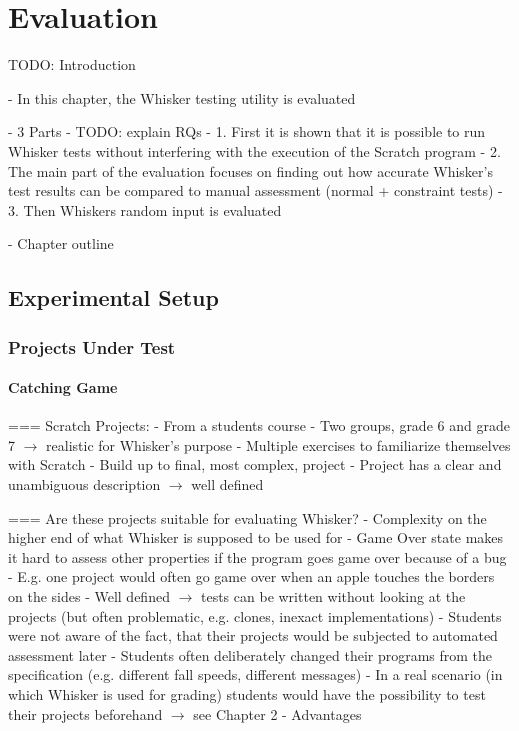 

\chapter{Evaluation}%
\label{cha:evaluation}

TODO: Introduction

- In this chapter, the Whisker testing utility is evaluated

- 3 Parts
- TODO: explain RQs
    - 1. First it is shown that it is possible to run Whisker tests without interfering with the execution of the Scratch program
    - 2. The main part of the evaluation focuses on finding out how accurate Whisker's test results can be compared to manual assessment (normal + constraint tests)
    - 3. Then Whiskers random input is evaluated

- Chapter outline

\section{Experimental Setup}

\subsection{Projects Under Test}

\subsubsection*{Catching Game}

=== Scratch Projects:
- From a students course
- Two groups, grade 6 and grade 7 $\rightarrow$ realistic for Whisker's purpose
- Multiple exercises to familiarize themselves with Scratch
- Build up to final, most complex, project
- Project has a clear and unambiguous description $\rightarrow$ well defined

=== Are these projects suitable for evaluating Whisker?
- Complexity on the higher end of what Whisker is supposed to be used for
- Game Over state makes it hard to assess other properties if the program goes game over because of a bug
    - E.g. one project would often go game over when an apple touches the borders on the sides
    - Well defined $\rightarrow$ tests can be written without looking at the projects (but often problematic, e.g. clones, inexact implementations)
- Students were not aware of the fact, that their projects would be subjected to automated assessment later
    - Students often deliberately changed their programs from the specification (e.g. different fall speeds, different messages)
    - In a real scenario (in which Whisker is used for grading) students would have the possibility to test their projects beforehand
    $\rightarrow$ see Chapter 2 - Advantages

